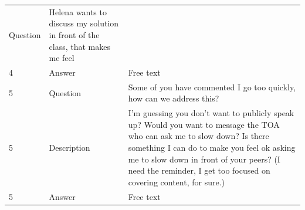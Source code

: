 \documentclass[paper=a4,justified,a4paper]{tufte-handout}
\begin{document}
\begin{longtable}[]{@{}lll@{}}
\begin{minipage}[t]{0.30\columnwidth}
Question\strut
\end{minipage} & \begin{minipage}[t]{0.30\columnwidth}\raggedright
Helena wants to discuss my solution in front of the class, that makes me
feel\strut
\end{minipage}\tabularnewline
\begin{minipage}[t]{0.30\columnwidth}\raggedright
4\strut
\end{minipage} & \begin{minipage}[t]{0.30\columnwidth}\raggedright
Answer\strut
\end{minipage} & \begin{minipage}[t]{0.30\columnwidth}\raggedright
Free text\strut
\end{minipage}\tabularnewline
\begin{minipage}[t]{0.30\columnwidth}\raggedright
5\strut
\end{minipage} & \begin{minipage}[t]{0.30\columnwidth}\raggedright
Question\strut
\end{minipage} & \begin{minipage}[t]{0.30\columnwidth}\raggedright
Some of you have commented I go too quickly, how can we address
this?\strut
\end{minipage}\tabularnewline
\begin{minipage}[t]{0.30\columnwidth}\raggedright
5\strut
\end{minipage} & \begin{minipage}[t]{0.30\columnwidth}\raggedright
Description\strut
\end{minipage} & \begin{minipage}[t]{0.30\columnwidth}\raggedright
I'm guessing you don't want to publicly speak up? Would you want to
message the TOA who can ask me to slow down? Is there something I can do
to make you feel ok asking me to slow down in front of your peers? (I
need the reminder, I get too focused on covering content, for
sure.)\strut
\end{minipage}\tabularnewline
\begin{minipage}[t]{0.30\columnwidth}\raggedright
5\strut
\end{minipage} & \begin{minipage}[t]{0.30\columnwidth}\raggedright
Answer\strut
\end{minipage} & \begin{minipage}[t]{0.30\columnwidth}\raggedright
Free text\strut
\end{minipage}\tabularnewline

\end{longtable}
\end{document}
